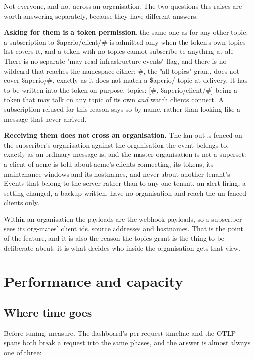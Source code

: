\documentclass[11pt,a4paper,oneside]{book}
\newcommand{\aperiobreakableunderscore}{\textunderscore\allowbreak}
\newcommand{\aperiocodebreaks}{\XeTeXinterchartokenstate=1 }
\newcommand{\aperiocodebreaks}{}
\DeclareRobustCommand{\code}[1]{{\ttfamily\small\aperiocodebreaks
  \let\_\aperiobreakableunderscore#1}}
\begin{document}
Not everyone, and not across an organisation. The two questions this
raises are worth answering separately, because they have different
answers.

\textbf{Asking for them is a token permission}, the same one as for any
other topic: a subscription to \code{\$aperio/client/\#} is admitted only
when the token's own \code{topics} list covers it, and a token with no
\code{topics} cannot subscribe to anything at all. There is no separate
"may read infrastructure events" flag, and there is no wildcard that
reaches the namespace either: \code{\#}, the "all topics" grant, does not
cover \code{\$aperio/\#}, exactly as it does not match a \code{\$aperio/}
topic at delivery. It has to be written into the token on purpose,
\code{topics: [\#, \$aperio/client/\#]} being a token that may talk on
any topic of its own \emph{and} watch clients connect. A subscription
refused for this reason says so by name, rather than looking like a
message that never arrived.

\textbf{Receiving them does not cross an organisation.} The fan-out is
fenced on the subscriber's organisation against the organisation the
event belongs to, exactly as an ordinary message is, and the master
organisation is not a superset: a client of \code{acme} is told about
\code{acme}'s clients connecting, its tokens, its maintenance windows and
its hostnames, and never about another tenant's. Events that belong to
the server rather than to any one tenant, an alert firing, a setting
changed, a backup written, have no organisation and reach the un-fenced
clients only.

Within an organisation the payloads are the webhook payloads, so a
subscriber sees its org-mates' client ids, source addresses and
hostnames. That is the point of the feature, and it is also the reason
the \code{topics} grant is the thing to be deliberate about: it is what
decides who inside the organisation gets that view.

\chapter{Performance and capacity}
\label{ch:performance}

\section{Where time goes}

Before tuning, measure. The dashboard's per-request timeline and the OTLP
spans both break a request into the same phases, and the answer is almost
always one of three:
\end{document}
